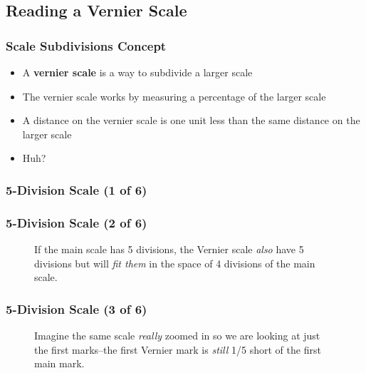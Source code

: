 \subsection{Reading a Vernier Scale}

\begin{frame}
	\frametitle{Scale Subdivisions Concept}
    
    \begin{itemize}[<+- | alert@+>]
        \item A \textbf{vernier scale} is a way to subdivide a larger scale
        \item The vernier scale works by measuring a percentage of the larger scale
        \item A distance on the vernier scale is one unit less than the same distance on the larger scale
        \item Huh?
    \end{itemize}    
\end{frame}

\begin{frame}
	\frametitle{5-Division Scale (1 of 6)}

    \begin{figure}
        \centering
        \resizebox{0.5\columnwidth}{!}{
            
            }
    \end{figure}  
\end{frame}

\begin{frame}
	\frametitle{5-Division Scale (2 of 6)}

    \begin{figure}
        \centering
        \resizebox{0.5\columnwidth}{!}{
            
            }
        
        \vspace{0.5em}
        {\footnotesize If the main scale has 5 divisions, the Vernier scale \emph{also} have 5 divisions but will \emph{fit them} in the space of 4 divisions of the main scale.\par}
    \end{figure}  
\end{frame}

\begin{frame}
	\frametitle{5-Division Scale (3 of 6)}

    \begin{figure}
        \centering
        \resizebox{0.5\columnwidth}{!}{
            
            }
        
        \vspace{0.5em}
        {\footnotesize Imagine the same scale \emph{really} zoomed in so we are looking at just the first marks--the first Vernier mark is \emph{still} 1/5 short of the first main mark.\par}
    \end{figure}  
\end{frame}

